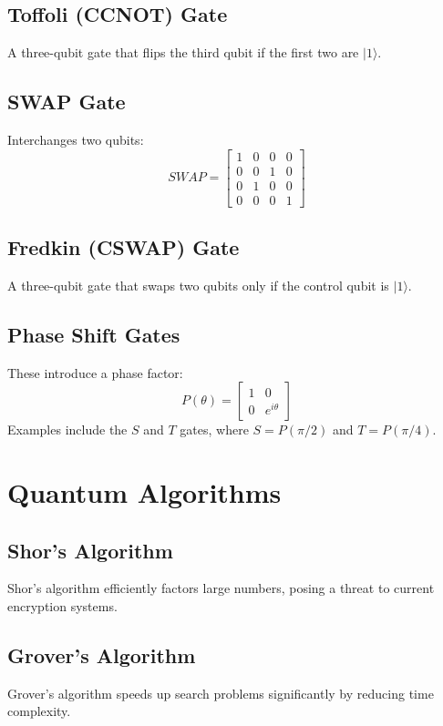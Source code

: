 \documentclass[a4paper,12pt]{article}
\begin{document}
\subsection{Toffoli (CCNOT) Gate}
A three-qubit gate that flips the third qubit if the first two are $|1\rangle$.

\subsection{SWAP Gate}
Interchanges two qubits:
\begin{equation}
SWAP = \begin{bmatrix} 1 & 0 & 0 & 0 \\ 0 & 0 & 1 & 0 \\ 0 & 1 & 0 & 0 \\ 0 & 0 & 0 & 1 \end{bmatrix}
\end{equation}

\subsection{Fredkin (CSWAP) Gate}
A three-qubit gate that swaps two qubits only if the control qubit is $|1\rangle$.

\subsection{Phase Shift Gates}
These introduce a phase factor:
\begin{equation} P(\theta) = \begin{bmatrix} 1 & 0 \\ 0 & e^{i\theta} \end{bmatrix} \end{equation}
Examples include the $S$ and $T$ gates, where $S=P(\pi/2)$ and $T=P(\pi/4)$.

\section{Quantum Algorithms}
\subsection{Shor’s Algorithm}
Shor’s algorithm efficiently factors large numbers, posing a threat to current encryption systems.

\subsection{Grover’s Algorithm}
Grover’s algorithm speeds up search problems significantly by reducing time complexity.
\end{document}
